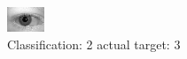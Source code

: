 \begin{figure}[h!]
\begin{center}
\includegraphics[width=0.60\columnwidth]{figures/ID674_class_2_target_3.png}
\end{center}
\caption{ Classification: 2 actual target: 3}
\label{fig:ID674_class_2_target_3}
\end{figure}
